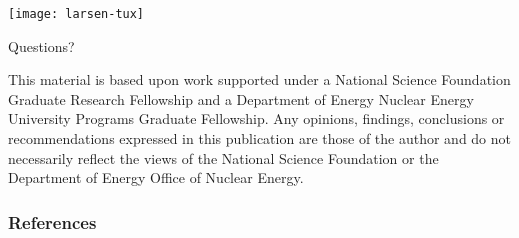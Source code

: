 \documentclass{beamer}
\begin{document}
\appendix
\begin{frame}

{\par\centering\hspace{-.35in}
  \texttt{[image: larsen-tux]}
  \par}

\vspace{-3in}
{\par\Huge Questions?
\par}%
\vspace{3in}

{\vspace{-.25in}%
\setlength{\baselineskip}{-\baselineskip} \tiny %
This material is based upon work supported under a National Science Foundation
Graduate Research Fellowship and a Department of Energy Nuclear Energy
University Programs Graduate Fellowship. Any opinions, findings, conclusions or
recommendations expressed in this publication are those of the author and do
not necessarily reflect the views of the National Science Foundation or the
Department of Energy Office of Nuclear Energy.\par}

\end{frame}

\begin{frame}
  \frametitle{References}


\end{frame}
\end{document}
